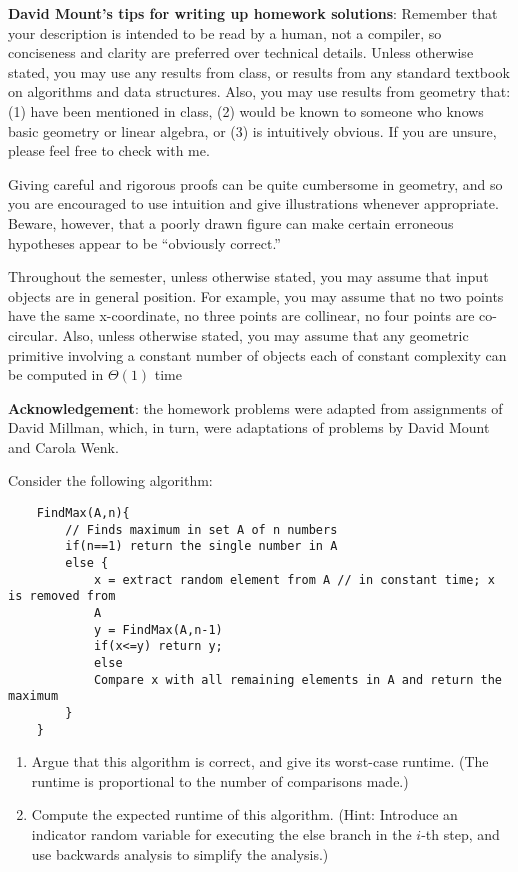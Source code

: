 \documentclass{article}
\begin{document}
{\bf David Mount's tips for writing up homework solutions}:
Remember that your description is intended to be read by a
human, not a compiler, so conciseness and clarity are preferred over technical
details.  Unless otherwise stated, you may use any results from class, or
results from any standard textbook on algorithms and data structures. Also, you
may use results from geometry that: (1) have been mentioned in class, (2) would
be known to someone who knows basic geometry or linear algebra, or (3) is
intuitively obvious. If you are unsure, please feel free to check with me.

Giving careful and rigorous proofs can be quite cumbersome in geometry, and so
you are encouraged to use intuition and give illustrations whenever appropriate.
Beware, however, that a poorly drawn figure can make certain erroneous
hypotheses appear to be ``obviously correct.''

Throughout the semester, unless otherwise stated, you may assume that input
objects are in general position. For example, you may assume that no two points
have the same x-coordinate, no three points are collinear, no four points are
co-circular. Also, unless otherwise stated, you may assume that any geometric
primitive involving a constant number of objects each of constant complexity can
be computed in $\Theta(1)$ time


{\bf Acknowledgement}: the homework problems were adapted from assignments of David
Millman, which, in turn, were adaptations of problems by David Mount and Carola
Wenk.

\collab{\todo{}}

Consider the following algorithm:

\begin{verbatim}
    FindMax(A,n){
        // Finds maximum in set A of n numbers
        if(n==1) return the single number in A
        else {
            x = extract random element from A // in constant time; x is removed from
            A
            y = FindMax(A,n-1)
            if(x<=y) return y;
            else
            Compare x with all remaining elements in A and return the maximum
        }
    }
\end{verbatim}

\begin{enumerate}

    \item Argue that this algorithm is correct, and give its worst-case
        runtime. (The runtime is proportional to the number of comparisons made.)


    \item Compute the expected runtime of this algorithm.  (Hint:
        Introduce an indicator random variable for executing the else branch in the
        $i$-th step, and use backwards analysis to simplify the analysis.)


\end{enumerate}
\end{document}
